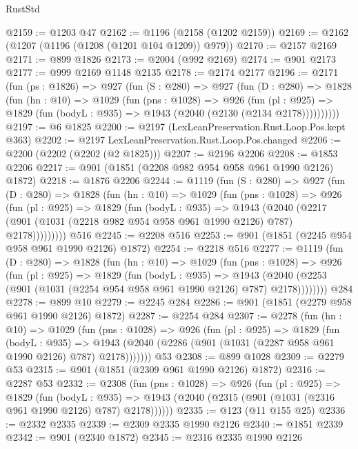 \begin{lexlean}{RustStd}
\begin{coremodule}
@2159 := @1203 @47
@2162 := @1196 (@2158 (@1202 @2159))
@2169 := @2162 (@1207 (@1196 (@1208 (@1201 @104 @1209)) @979))
@2170 := @2157 @2169
@2171 := @899 @1826
@2173 := @2004 (@992 @2169)
@2174 := @901 @2173
@2177 := @999 @2169 @1148 @2135
@2178 := @2174 @2177
@2196 := @2171
    (fun (ps : @1826) =>
    @927
      (fun (S : @280) =>
      @927
        (fun (D : @280) =>
        @1828
          (fun (hn : @10) =>
          @1029
            (fun (pns : @1028) =>
            @926
              (fun (pl : @925) =>
              @1829 (fun (bodyL : @935) => @1943 (@2040 (@2130 (@2134 @2178))))))))))
@2197 := @6 @1825
@2200 := @2197 (LexLeanPreservation.Rust.Loop.Pos.kept @363)
@2202 := @2197 LexLeanPreservation.Rust.Loop.Pos.changed
@2206 := @2200 (@2202 (@2202 (@2 @1825)))
@2207 := @2196 @2206
@2208 := @1853 @2206
@2217 := @901 (@1851 (@2208 @982 @954 @958 @961 @1990 @2126) @1872)
@2218 := @1876 @2206
@2244 := @1119
    (fun (S : @280) =>
    @927
      (fun (D : @280) =>
      @1828
        (fun (hn : @10) =>
        @1029
          (fun (pns : @1028) =>
          @926
            (fun (pl : @925) =>
            @1829
              (fun (bodyL : @935) =>
              @1943
                (@2040
                  (@2217 (@901 (@1031 (@2218 @982 @954 @958 @961 @1990 @2126) @787) @2178)))))))))
    @516
@2245 := @2208 @516
@2253 := @901 (@1851 (@2245 @954 @958 @961 @1990 @2126) @1872)
@2254 := @2218 @516
@2277 := @1119
    (fun (D : @280) =>
    @1828
      (fun (hn : @10) =>
      @1029
        (fun (pns : @1028) =>
        @926
          (fun (pl : @925) =>
          @1829
            (fun (bodyL : @935) =>
            @1943 (@2040 (@2253 (@901 (@1031 (@2254 @954 @958 @961 @1990 @2126) @787) @2178))))))))
    @284
@2278 := @899 @10
@2279 := @2245 @284
@2286 := @901 (@1851 (@2279 @958 @961 @1990 @2126) @1872)
@2287 := @2254 @284
@2307 := @2278
    (fun (hn : @10) =>
    @1029
      (fun (pns : @1028) =>
      @926
        (fun (pl : @925) =>
        @1829
          (fun (bodyL : @935) =>
          @1943 (@2040 (@2286 (@901 (@1031 (@2287 @958 @961 @1990 @2126) @787) @2178)))))))
    @53
@2308 := @899 @1028
@2309 := @2279 @53
@2315 := @901 (@1851 (@2309 @961 @1990 @2126) @1872)
@2316 := @2287 @53
@2332 := @2308
    (fun (pns : @1028) =>
    @926
      (fun (pl : @925) =>
      @1829
        (fun (bodyL : @935) =>
        @1943 (@2040 (@2315 (@901 (@1031 (@2316 @961 @1990 @2126) @787) @2178))))))
@2335 := @123 (@11 @155 @25)
@2336 := @2332 @2335
@2339 := @2309 @2335 @1990 @2126
@2340 := @1851 @2339
@2342 := @901 (@2340 @1872)
@2345 := @2316 @2335 @1990 @2126

\end{coremodule}
\end{lexlean}
